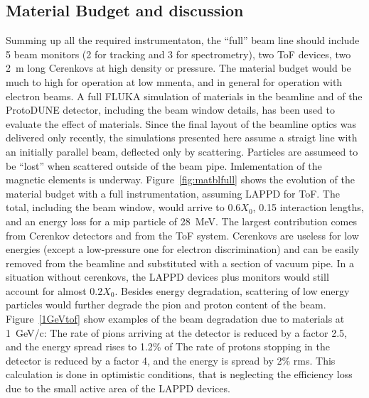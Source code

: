 \subsection{Material Budget and discussion}
Summing up all the required instrumentaton, the ``full'' beam line should include 5 beam monitors (2 for tracking and 3 for spectrometry), two ToF devices, two 2~m long Cerenkovs at high density or pressure. The material budget would be much to high for operation at low mmenta, and in general for operation with electron beams.  
A full FLUKA simulation of materials in the beamline and of the ProtoDUNE detector, including the beam window details, has been used to evaluate the effect of materials. Since the final layout of the beamline optics was delivered only recently, the simulations presented here assume a straigt line with an initially parallel beam, deflected only by scattering. Particles are assumeed to be ``lost'' when scattered outside of the beam pipe. Imlementation of the magnetic elements is underway.
 Figure~\ref{fig:matblfull} shows the evolution of the material budget with a full instrumentation, assuming LAPPD for ToF. The total, including the beam window, would arrive to $0.6X_0$, 0.15 interaction lengths, and an energy loss for a mip particle of 28~MeV.
The largest contribution comes from Cerenkov detectors and from the  ToF system. Cerenkovs are useless for low energies (except a low-pressure one for electron discrimination) and can be easily removed from the beamline and substituted with a section of vacuum pipe.  
In a situation without cerenkovs, the LAPPD devices plus monitors would still account for almost  $0.2X_0$. Besides energy degradation, scattering of low energy particles would  further degrade the pion and proton content of the beam.  Figure~\ref{1GeVtof} show examples of the beam degradation due to materials at 1~GeV/c: The rate of pions arriving at the detector is reduced by a factor 2.5, and the energy spread rises to 1.2\% of The rate of protons stopping in the detector is reduced by a factor 4, and the energy is spread by 2\% rms. This calculation is done in optimistic conditions, that is neglecting the efficiency loss due to the small active area of the LAPPD devices.

